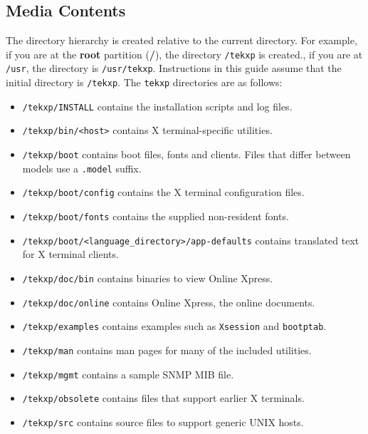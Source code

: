 \subsection {Media Contents}

The directory hierarchy is created relative to the current directory. For
example, if you are at the {\bf root} partition ({\bf /}), the directory
{\tt /tekxp} is created., if you are at {\tt /usr}, the directory is
{\tt /usr/tekxp}.  Instructions in this guide assume that the initial directory
is {\tt /tekxp}. The {\tt tekxp} directories are as follows:

\begin {itemize}

\item {\tt /tekxp/INSTALL} contains the installation scripts and log files.

\item {\tt /tekxp/bin/<host>} contains X terminal-specific utilities.

\item {\tt /tekxp/boot} contains boot files, fonts and clients. Files that
differ between models use a {\tt .model} suffix.

\item {\tt /tekxp/boot/config} contains the X terminal configuration files.

\item {\tt /tekxp/boot/fonts} contains the supplied non-resident fonts.

\item {\tt /tekxp/boot/<language\_directory>/app-defaults} contains translated
text for X terminal clients.

\item {\tt /tekxp/doc/bin} contains binaries to view Online Xpress.

\item {\tt /tekxp/doc/online} contains Online Xpress, the online documents.

\item {\tt /tekxp/examples} contains examples such as {\tt Xsession} and
{\tt bootptab}.

\item {\tt /tekxp/man} contains man pages for many of the included utilities.

\item {\tt /tekxp/mgmt} contains a sample SNMP MIB file.

\item {\tt /tekxp/obsolete} contains files that support earlier X terminals.

\item {\tt /tekxp/src} contains source files to support generic UNIX hosts.

\end {itemize}


